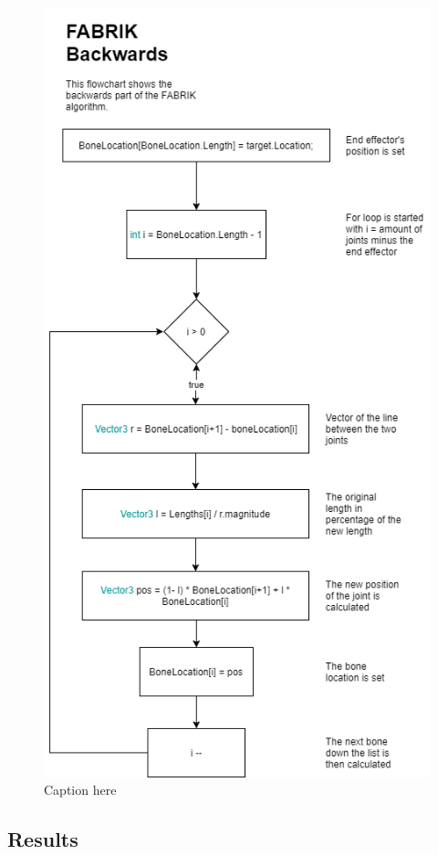 \begin{figure}[H]
\centering
\includegraphics[width=\textwidth]{Flowchart.png}
\caption{Caption here}
\label{fig:flow}
\end{figure}

\subsection{Results}

